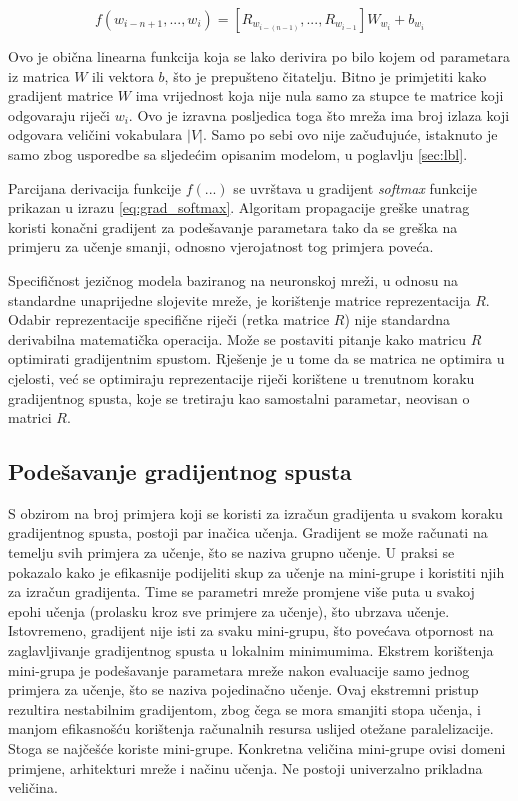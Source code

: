 \documentclass[times, utf8, diplomski, numeric]{fer}
\begin{document}
\[
f(w_{i - n + 1}, ..., w_i) = \left[R_{w_{i - (n - 1)}}, ..., R_{w_{i - 1}}\right] W_{w_i} + b_{w_i}
\]

Ovo je obična linearna funkcija koja se lako derivira po bilo kojem od parametara iz matrica $W$ ili vektora $b$, što je prepušteno čitatelju. Bitno je primjetiti kako gradijent matrice $W$ ima vrijednost koja nije nula samo za stupce te matrice koji odgovaraju riječi $w_i$. Ovo je izravna posljedica toga što mreža ima broj izlaza koji odgovara veličini vokabulara $|V|$. Samo po sebi ovo nije začuđujuće, istaknuto je samo zbog usporedbe sa sljedećim opisanim modelom, u poglavlju \ref{sec:lbl}.

Parcijana derivacija funkcije $f(...)$ se uvrštava u gradijent \textit{softmax} funkcije prikazan u izrazu \ref{eq:grad_softmax}. Algoritam propagacije greške unatrag koristi konačni gradijent za podešavanje parametara tako da se greška na primjeru za učenje smanji, odnosno vjerojatnost tog primjera poveća. 

Specifičnost jezičnog modela baziranog na neuronskoj mreži, u odnosu na standardne unaprijedne slojevite mreže, je korištenje matrice reprezentacija $R$. Odabir reprezentacije specifične riječi (retka matrice $R$) nije standardna derivabilna matematička operacija. Može se postaviti pitanje kako matricu $R$ optimirati gradijentnim spustom. Rješenje je u tome da se matrica ne optimira u cjelosti, već se optimiraju reprezentacije riječi korištene u trenutnom koraku gradijentnog spusta, koje se tretiraju kao samostalni parametar, neovisan o matrici $R$.

\subsection{Podešavanje gradijentnog spusta}

S obzirom na broj primjera koji se koristi za izračun gradijenta u svakom koraku gradijentnog spusta, postoji par inačica učenja. Gradijent se može računati na temelju svih primjera za učenje, što se naziva grupno  učenje. U praksi se pokazalo kako je efikasnije podijeliti skup za učenje na mini-grupe  i koristiti njih za izračun gradijenta. Time se parametri mreže promjene više puta u svakoj epohi učenja (prolasku kroz sve primjere za učenje), što ubrzava učenje. Istovremeno, gradijent nije isti za svaku mini-grupu, što povećava otpornost na zaglavljivanje gradijentnog spusta u lokalnim minimumima. Ekstrem korištenja mini-grupa je podešavanje parametara mreže nakon evaluacije samo jednog primjera za učenje, što se naziva pojedinačno  učenje. Ovaj ekstremni pristup rezultira nestabilnim gradijentom, zbog čega se mora smanjiti stopa učenja, i manjom efikasnošću korištenja računalnih resursa uslijed otežane paralelizacije. Stoga se najčešće koriste mini-grupe. Konkretna veličina mini-grupe ovisi domeni primjene, arhitekturi mreže i načinu učenja. Ne postoji univerzalno prikladna veličina.
\end{document}
